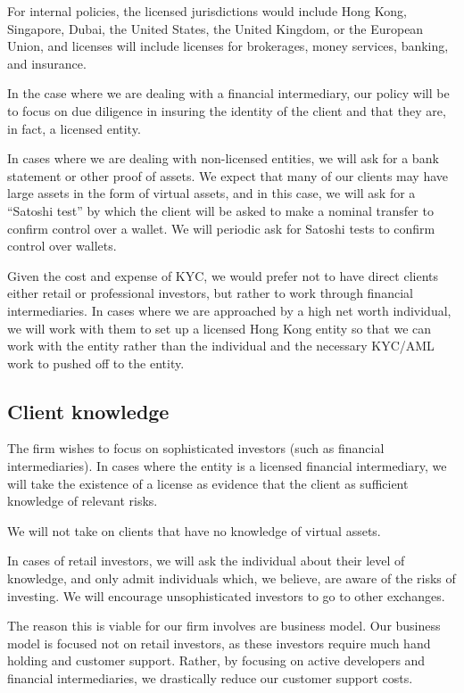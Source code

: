 For internal policies, the licensed jurisdictions would
include Hong Kong, Singapore, Dubai, the United States, the United
Kingdom, or the European Union, and licenses will include licenses for
brokerages, money services, banking, and insurance.

In the case where we are dealing with a financial intermediary, our
policy will be to focus on due diligence in insuring the identity of
the client and that they are, in fact, a licensed entity.

In cases where we are dealing with non-licensed entities, we will ask
for a bank statement or other proof of assets.  We expect that many of
our clients may have large assets in the form of virtual assets, and
in this case, we will ask for a ``Satoshi test'' by which the client
will be asked to make a nominal transfer to confirm control over a
wallet.  We will periodic ask for Satoshi tests to confirm control
over wallets.

Given the cost and expense of KYC, we would prefer not to have direct
clients either retail or professional investors, but rather to work
through financial intermediaries.  In cases where we are approached by
a high net worth individual, we will work with them to set up a licensed
Hong Kong entity so that we can work with the entity rather than the
individual and the necessary KYC/AML work to pushed off to the entity.

\subsection{Client knowledge}

The firm wishes to focus on sophisticated investors (such as financial
intermediaries).  In cases where the entity is a licensed
financial intermediary, we will take the existence of a license as
evidence that the client as sufficient knowledge of relevant risks.

We will not take on clients that have no knowledge of virtual assets.

In cases of retail investors, we will ask the individual about their
level of knowledge, and only admit individuals which, we believe, are
aware of the risks of investing.  We will encourage unsophisticated
investors to go to other exchanges.

The reason this is viable for our firm involves are business model.
Our business model is focused not on retail investors, as these
investors require much hand holding and customer support.  Rather, by
focusing on active developers and financial intermediaries, we
drastically reduce our customer support costs.


